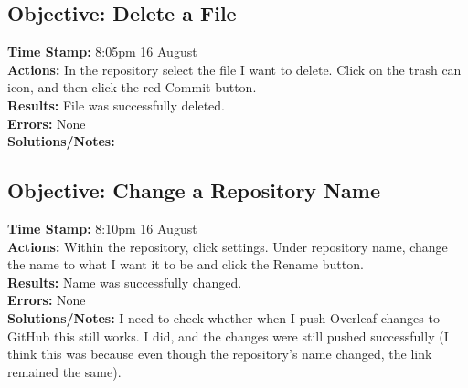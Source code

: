 \documentclass{article}
\begin{document}
\begin{FlushLeft}
\subsection{Objective: Delete a File}
\textbf{Time Stamp:} 8:05pm 16 August\\
\textbf{Actions:} In the repository select the file I want to delete. Click on the trash can icon, and then click the red Commit button.\\
\textbf{Results:} File was successfully deleted.\\
\textbf{Errors:} None\\
\textbf{Solutions/Notes:}

\subsection{Objective: Change a Repository Name}
\textbf{Time Stamp:} 8:10pm 16 August\\
\textbf{Actions:} Within the repository, click settings. Under repository name, change the name to what I want it to be and click the Rename button.\\
\textbf{Results:} Name was successfully changed.\\
\textbf{Errors:} None\\
\textbf{Solutions/Notes:} I need to check whether when I push Overleaf changes to GitHub this still works. I did, and the changes were still pushed successfully (I think this was because even though the repository's name changed, the link remained the same).


\end{FlushLeft}
\end{document}
